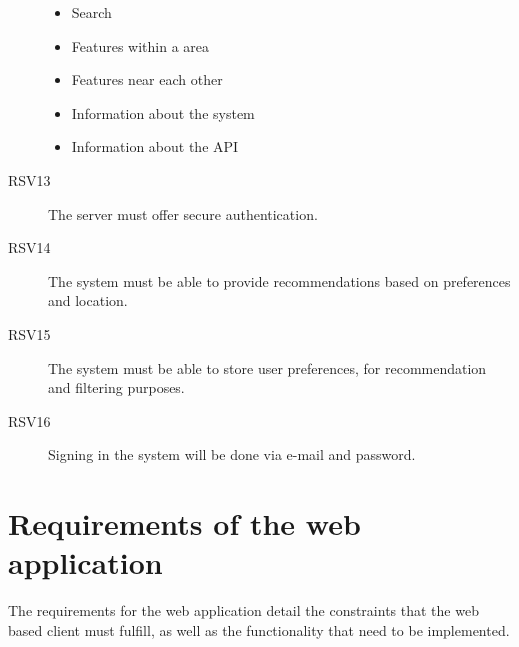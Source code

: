 \begin{description}
  \begin{itemize}
  \item Search
  \item Features within a area
  \item Features near each other
  \item Information about the system
  \item Information about the API
  \end{itemize} 
\item[RSV13] The server must offer secure authentication.
\item[RSV14] The system must be able to provide recommendations based on preferences and location.
\item[RSV15] The system must be able to store user preferences, for recommendation and filtering purposes.
\item[RSV16] Signing in the system will be done via e-mail and password.
\end{description}

\section{Requirements of the web application}

The requirements for the web application detail the constraints that the web based client must fulfill, as well as the functionality that need to be implemented.

